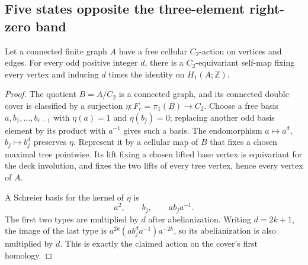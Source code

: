 \subsection{Five states opposite the three-element right-zero band}

\begin{lemma}
\label{C:double-cover-graph-scalar}
Let a connected finite graph $A$ have a free cellular $C_2$-action
on vertices and edges. For every odd positive integer $d$, there
is a $C_2$-equivariant self-map fixing every vertex and inducing
$d$ times the identity on $H_1(A;\mathbb Z)$.
\end{lemma}
\begin{proof}
The quotient $B=A/C_2$ is a connected graph, and its connected
double cover is classified by a surjection
$\eta:F_r=\pi_1(B)\to C_2$.
Choose a free basis $a,b_1,\ldots,b_{r-1}$ with
$\eta(a)=1$ and $\eta(b_j)=0$; replacing another odd basis
element by its product with $a^{-1}$ gives such a basis.
The endomorphism $a\mapsto a^d$, $b_j\mapsto b_j^d$
preserves $\eta$. Represent it by a cellular map of $B$
that fixes a chosen maximal tree pointwise. Its lift fixing
a chosen lifted base vertex is equivariant for the deck
involution, and fixes the two lifts of every tree vertex,
hence every vertex of $A$.

A Schreier basis for the kernel of $\eta$ is
\[
 a^2,\qquad b_j,\qquad ab_ja^{-1}.
\]
The first two types are multiplied by $d$ after abelianization.
Writing $d=2k+1$, the image of the last type is
$a^{2k}(ab_j^da^{-1})a^{-2k}$, so its abelianization is
also multiplied by $d$. This is exactly the claimed action
on the cover's first homology.
\end{proof}

